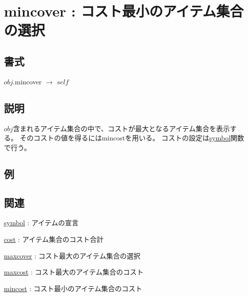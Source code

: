 
\section{mincover : コスト最小のアイテム集合の選択\label{sect:mincover}}
\subsection*{書式}
$obj$.mincover $\rightarrow$ $self$

\subsection*{説明}
$obj$含まれるアイテム集合の中で、コストが最大となるアイテム集合を表示する。
そのコストの値を得るにはmincostを用いる。
コストの設定は\hyperref[sect:symbol]{symbol}関数で行う。

\subsection*{例}


\subsection*{関連}
\hyperref[sect:symbol]{symbol} : アイテムの宣言

\hyperref[sect:cost]{cost} : アイテム集合のコスト合計

\hyperref[sect:maxcover]{maxcover} : コスト最大のアイテム集合の選択

\hyperref[sect:maxcost]{maxcost} : コスト最大のアイテム集合のコスト

\hyperref[sect:mincost]{mincost} : コスト最小のアイテム集合のコスト


